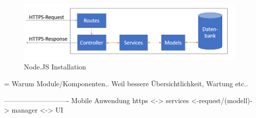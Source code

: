 \begin{figure}[h]
\includegraphics[width=\textwidth]{images/backendstruktur.PNG}
\caption{Node.JS Installation}
\end{figure}

= Warum Module/Komponenten.. Weil bessere Übersichtlichkeit, Wartung etc..

----------------------------
\newline Mobile Anwendung
https <-> services <-request/(modell)-> manager <-> UI

